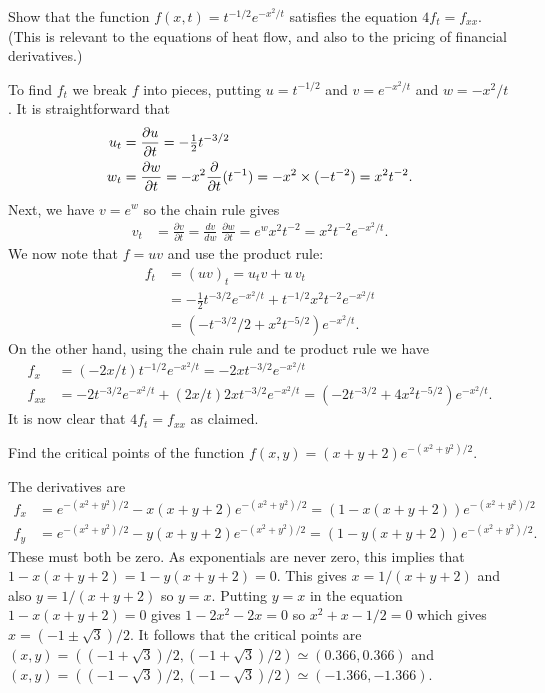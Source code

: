 \documentclass[a4paper]{amsart}
\renewenvironment{solution}{\SolutionInline}{\endSolutionInline}
\begin{document}
\begin{exercise}
 Show that the function $f(x,t)=t^{-1/2}e^{-x^2/t}$ satisfies the
 equation $4f_t=f_{xx}$.  (This is relevant to the equations of heat
 flow, and also to the pricing of financial derivatives.)
\end{exercise}
\begin{solution}
 To find $f_t$ we break $f$ into pieces, putting $u=t^{-1/2}$ and
 $v=e^{-x^2/t}$ and $w=-x^2/t$.  It is straightforward that
 \begin{align*}
  u_t &= \frac{\partial u}{\partial t}
       = -\tfrac{1}{2}t^{-3/2} \\
  w_t &= \frac{\partial w}{\partial t} 
       = -x^2 \frac{\partial}{\partial t}(t^{-1}) 
       = -x^2 \times (-t^{-2}) = x^2t^{-2}.
 \end{align*}
 Next, we have $v=e^w$ so the chain rule gives
 \begin{align*}
  v_t &= \frac{\partial v}{\partial t} 
       = \frac{dv}{dw} \; \frac{\partial w}{\partial t} 
       = e^w x^2 t^{-2}
       = x^2 t^{-2} e^{-x^2/t}.
 \end{align*}
 We now note that $f=uv$ and use the product rule:
 \begin{align*}
  f_t &= (uv)_t = u_t v + u\,v_t \\
      &= -\tfrac{1}{2} t^{-3/2} e^{-x^2/t} 
         + t^{-1/2} x^2 t^{-2} e^{-x^2/t} \\
      &= (-t^{-3/2}/2 + x^2t^{-5/2}) e^{-x^2/t}.
 \end{align*}
 On the other hand, using the chain rule and te product rule we have
 \begin{align*}
  f_x &= (-2x/t)t^{-1/2} e^{-x^2/t} 
       = -2x t^{-3/2} e^{-x^2/t} \\
  f_{xx} &= -2t^{-3/2} e^{-x^2/t} + 
              (2x/t) 2x t^{-3/2} e^{-x^2/t}
          = (-2t^{-3/2} + 4x^2t^{-5/2}) e^{-x^2/t}. 
 \end{align*}
 It is now clear that $4f_t=f_{xx}$ as claimed.
\end{solution}

\begin{exercise}
 Find the critical points of the function
 $f(x,y)=(x+y+2)e^{-(x^2+y^2)/2}$.
\end{exercise}
\begin{solution}
 The derivatives are
 \begin{align*}
  f_x &= e^{-(x^2+y^2)/2} -x(x+y+2)e^{-(x^2+y^2)/2}
       = (1-x(x+y+2)) e^{-(x^2+y^2)/2} \\
  f_y &= e^{-(x^2+y^2)/2} -y(x+y+2)e^{-(x^2+y^2)/2}
       = (1-y(x+y+2)) e^{-(x^2+y^2)/2}.
 \end{align*}
 These must both be zero.  As exponentials are never zero, this
 implies that $1-x(x+y+2)=1-y(x+y+2)=0$.  This gives $x=1/(x+y+2)$ and
 also $y=1/(x+y+2)$ so $y=x$.  Putting $y=x$ in the equation
 $1-x(x+y+2)=0$ gives $1-2x^2-2x=0$ so $x^2+x-1/2=0$ which gives
 $x=(-1\pm\sqrt{3})/2$.  It follows that the critical points are
 $(x,y)=((-1+\sqrt{3})/2,(-1+\sqrt{3})/2)\simeq(0.366,0.366)$ and 
 $(x,y)=((-1-\sqrt{3})/2,(-1-\sqrt{3})/2)\simeq(-1.366,-1.366)$.
\end{solution}
\end{document}
